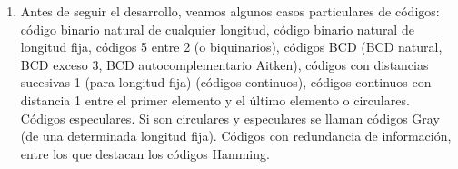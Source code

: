 \begin{enumerate}
\begin{enumerate}
    ``cig\#ueña'', y si lleva una til\-de como en Julián como
    ``Juli\textasciitilde an''. Un nombre más habitual que el de
    lenguaje en electrónica suele ser el de código.
  \item
    Antes de seguir el desarrollo, veamos algunos casos particulares de
    códigos: código binario natural de cualquier longitud, código
    binario natural de longitud fija, códigos 5 entre 2 (o biquinarios),
    códigos BCD (BCD natural, BCD exceso 3, BCD autocom\-plementario
    Aitken), códigos con distancias sucesivas 1 (para longitud fija)
    (códigos continuos), códigos continuos con distancia 1 entre el
    primer elemento y el último elemento o circulares. Códigos
    especulares. Si son circulares y especulares se llaman códigos Gray
    (de una determinada longitud fija). Códigos con redundancia de
    infor\-mación, entre los que destacan los códigos Hamming.


\end{enumerate}
\end{enumerate}
